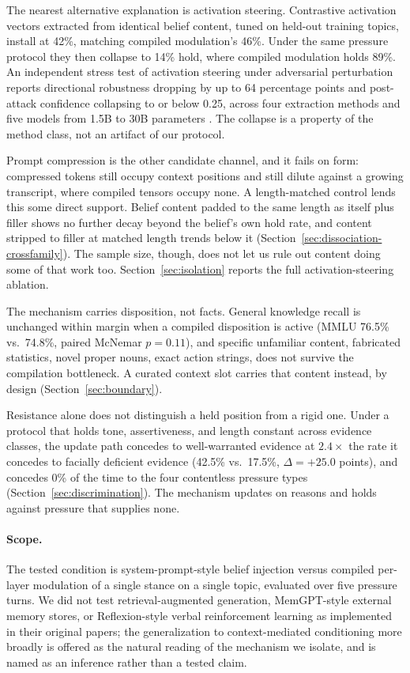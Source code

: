 The nearest alternative explanation is activation steering. Contrastive activation
vectors extracted from identical belief content, tuned on held-out training topics,
install at 42\%, matching compiled modulation's 46\%. Under the same pressure protocol
they then collapse to 14\% hold, where compiled modulation holds 89\%. An independent
stress test of activation steering under adversarial perturbation reports directional
robustness dropping by up to 64 percentage points and post-attack confidence collapsing
to or below 0.25, across four extraction methods and five models from 1.5B to 30B
parameters \citep{le2026steeringrobustness}. The collapse is a property of the method
class, not an artifact of our protocol.

Prompt compression is the other candidate channel, and it fails on form: compressed
tokens still occupy context positions and still dilute against a growing transcript,
where compiled tensors occupy none. A length-matched control lends this some direct
support. Belief content padded to the same length as itself plus filler shows no further
decay beyond the belief's own hold rate, and content stripped to filler at matched
length trends below it (Section~\ref{sec:dissociation-crossfamily}). The sample size,
though, does not let us rule out content doing some of that work too.
\iflongversion Section~\ref{sec:isolation} reports the full activation-steering ablation. \fi

The mechanism carries disposition, not facts. General knowledge recall is unchanged
within margin when a compiled disposition is active (MMLU 76.5\% vs.\ 74.8\%, paired
McNemar \(p=0.11\)), and specific unfamiliar content, fabricated statistics, novel
proper nouns, exact action strings, does not survive the compilation bottleneck. A
curated context slot carries that content instead, by design (Section~\ref{sec:boundary}).

Resistance alone does not distinguish a held position from a rigid one. Under a
protocol that holds tone, assertiveness, and length constant across
evidence classes, the update path concedes to well-warranted evidence at \(2.4\times\)
the rate it concedes to facially deficient evidence (42.5\% vs.\ 17.5\%, \(\Delta =
+25.0\) points), and concedes 0\% of the time to the four contentless pressure types
(Section~\ref{sec:discrimination}). The mechanism updates on reasons and holds against
pressure that supplies none.

\paragraph{Scope.} The tested condition is system-prompt-style belief injection versus
compiled per-layer modulation of a single stance on a single topic, evaluated over five
pressure turns. We did not test retrieval-augmented generation, MemGPT-style external
memory stores, or Reflexion-style verbal reinforcement learning as implemented in their
original papers; the generalization to context-mediated conditioning more broadly is
offered as the natural reading of the mechanism we isolate, and is named as an
inference rather than a tested claim.

